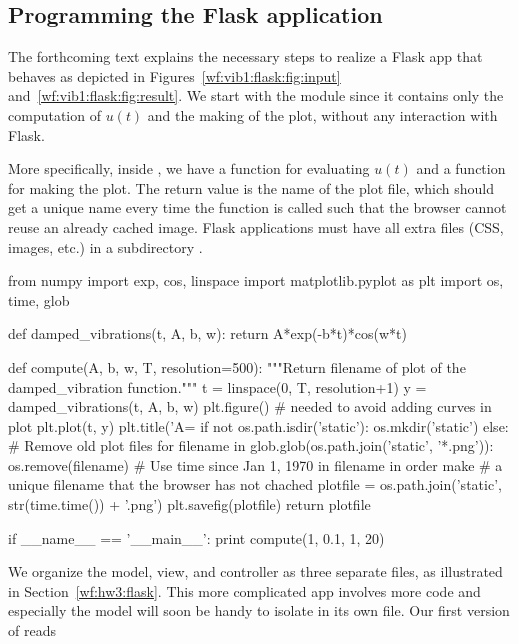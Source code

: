 \documentclass[%
oneside,                 %
final,                   %
10pt]{article}
\begin{document}
{{{{{{{{\subsection{Programming the Flask application}



The forthcoming text explains the necessary steps to realize a
Flask app that behaves as depicted in Figures~\ref{wf:vib1:flask:fig:input}
and~\ref{wf:vib1:flask:fig:result}. We start with the
 module since it contains only the computation of $u(t)$
and the making of the plot, without any interaction with Flask.

More specifically, inside , we have a function for
evaluating $u(t)$ and a  function for making the plot. The
return value is the name of the plot file, which should get a unique
name every time the  function is called such that the browser
cannot reuse an already cached image. Flask applications must have all
extra files (CSS, images, etc.) in a subdirectory .

\bpypro
from numpy import exp, cos, linspace
import matplotlib.pyplot as plt
import os, time, glob

def damped_vibrations(t, A, b, w):
    return A*exp(-b*t)*cos(w*t)

def compute(A, b, w, T, resolution=500):
    """Return filename of plot of the damped_vibration function."""
    t = linspace(0, T, resolution+1)
    y = damped_vibrations(t, A, b, w)
    plt.figure()  # needed to avoid adding curves in plot
    plt.plot(t, y)
    plt.title('A=%
    if not os.path.isdir('static'):
        os.mkdir('static')
    else:
        # Remove old plot files
        for filename in glob.glob(os.path.join('static', '*.png')):
            os.remove(filename)
    # Use time since Jan 1, 1970 in filename in order make
    # a unique filename that the browser has not chached
    plotfile = os.path.join('static', str(time.time()) + '.png')
    plt.savefig(plotfile)
    return plotfile

if __name__ == '__main__':
    print compute(1, 0.1, 1, 20)
\epypro


We organize the model, view, and controller as three separate
files, as illustrated in
Section~\ref{wf:hw3:flask}. This more complicated app involves
more code and especially the model will soon be handy to isolate in its own
file. Our first version of  reads

}}}}}}}}
\end{document}
